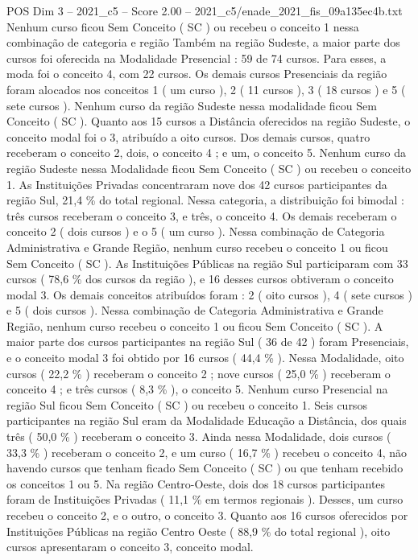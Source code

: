 \begin{textsample}{POS Dim 3 – 2021\_c5 – Score 2.00 – 2021\_c5/enade\_2021\_fis\_09a135ec4b.txt}
Nenhum curso ficou Sem Conceito ( SC ) ou recebeu o conceito 1 nessa combinação de categoria e região Também na região Sudeste, a maior parte dos cursos foi oferecida na Modalidade Presencial : 59 de 74 cursos.
Para esses, a moda foi o conceito 4, com 22 cursos.
Os demais cursos Presenciais da região foram alocados nos conceitos 1 ( um curso ), 2 ( 11 cursos ), 3 ( 18 cursos ) e 5 ( sete cursos ).
Nenhum curso da região Sudeste nessa modalidade ficou Sem Conceito ( SC ).
Quanto aos 15 cursos a Distância oferecidos na região Sudeste, o conceito modal foi o 3, atribuído a oito cursos.
Dos demais cursos, quatro receberam o conceito 2, dois, o conceito 4 ; e um, o conceito 5.
Nenhum curso da região Sudeste nessa Modalidade ficou Sem Conceito ( SC ) ou recebeu o conceito 1.
As Instituições Privadas concentraram nove dos 42 cursos participantes da região Sul, 21,4 \% do total regional.
Nessa categoria, a distribuição foi bimodal : três cursos receberam o conceito 3, e três, o conceito 4.
Os demais receberam o conceito 2 ( dois cursos ) e o 5 ( um curso ).
Nessa combinação de Categoria Administrativa e Grande Região, nenhum curso recebeu o conceito 1 ou ficou Sem Conceito ( SC ).
As Instituições Públicas na região Sul participaram com 33 cursos ( 78,6 \% dos cursos da região ), e 16 desses cursos obtiveram o conceito modal 3.
Os demais conceitos atribuídos foram : 2 ( oito cursos ), 4 ( sete cursos ) e 5 ( dois cursos ).
Nessa combinação de Categoria Administrativa e Grande Região, nenhum curso recebeu o conceito 1 ou ficou Sem Conceito ( SC ).
A maior parte dos cursos participantes na região Sul ( 36 de 42 ) foram Presenciais, e o conceito modal 3 foi obtido por 16 cursos ( 44,4 \% ).
Nessa Modalidade, oito cursos ( 22,2 \% ) receberam o conceito 2 ; nove cursos ( 25,0 \% ) receberam o conceito 4 ; e três cursos ( 8,3 \% ), o conceito 5.
Nenhum curso Presencial na região Sul ficou Sem Conceito ( SC ) ou recebeu o conceito 1.
Seis cursos participantes na região Sul eram da Modalidade Educação a Distância, dos quais três ( 50,0 \% ) receberam o conceito 3.
Ainda nessa Modalidade, dois cursos ( 33,3 \% ) receberam o conceito 2, e um curso ( 16,7 \% ) recebeu o conceito 4, não havendo cursos que tenham ficado Sem Conceito ( SC ) ou que tenham recebido os conceitos 1 ou 5.
Na região Centro-Oeste, dois dos 18 cursos participantes foram de Instituições Privadas ( 11,1 \% em termos regionais ).
Desses, um curso recebeu o conceito 2, e o outro, o conceito 3.
Quanto aos 16 cursos oferecidos por Instituições Públicas na região Centro Oeste ( 88,9 \% do total regional ), oito cursos apresentaram o conceito 3, conceito modal.

\end{textsample}
